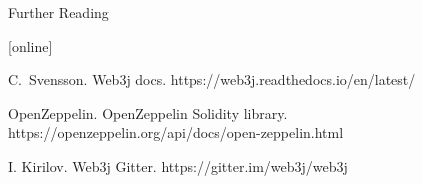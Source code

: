 \documentclass{beamer}
\begin{document}
\begin{frame}{Further Reading}
    
  \begin{thebibliography}{1}
  [online]
  
	    C.~Svensson.
	    \newblock Web3j docs.
	    \newblock https://web3j.readthedocs.io/en/latest/
	    
		OpenZeppelin.
	    \newblock OpenZeppelin Solidity library.
	    \newblock https://openzeppelin.org/api/docs/open-zeppelin.html
	    
	    I. Kirilov.
	    \newblock Web3j Gitter.
	    \newblock https://gitter.im/web3j/web3j
  
  \end{thebibliography}
\end{frame}
\end{document}
